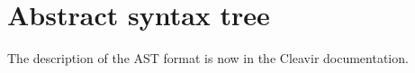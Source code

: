 \chapter{Abstract syntax tree}
\label{chap-abstract-syntax-tree}

The description of the AST format is now in the Cleavir documentation.
